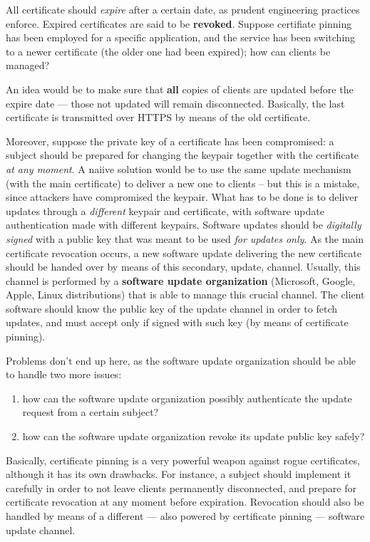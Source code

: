 \documentclass[10pt]{extreport}
\begin{document}
All certificate should \emph{expire} after a certain date, as prudent
engineering practices enforce. Expired certificates are said to be
\textbf{revoked}. Suppose certifiate pinning has been employed for
a specific application, and the service has been switching to a newer
certificate (the older one had been expired); how can clients be managed?

An idea would be to make sure that \textbf{all} copies of clients are updated
before the expire date --- those not updated will remain disconnected.
Basically, the last certificate is transmitted over HTTPS by means of the old
certificate.

Moreover, suppose the private key of a certificate has been compromised: a
subject should be prepared for changing the keypair together with the
certificate \emph{at any moment}. A naiive solution would be to use the same
update mechanism (with the main certificate) to deliver a new one to clients --
but this is a mistake, since attackers have compromised the keypair. What has
to be done is to deliver updates through a \emph{different} keypair and
certificate, with software update authentication made with different keypairs.
Software updates should be \emph{digitally signed} with a public key that was
meant to be used \emph{for updates only}. As the main certificate revocation
occurs, a new software update delivering the new certificate should be handed
over by means of this secondary, update, channel. Usually, this channel is
performed by a \textbf{software update organization} (Microsoft, Google, Apple,
Linux distributions) that is able to manage this crucial channel. The client
software should know the public key of the update channel in order to fetch
updates, and must accept only if signed with such key (by means of certificate
pinning).

Problems don't end up here, as the software update organization should be able
to handle two more issues:
\begin{enumerate}
    \item how can the software update organization possibly authenticate the update request
        from a certain subject?
    \item how can the software update organization revoke its update public key
        safely?
\end{enumerate}

Basically, certificate pinning is a very powerful weapon against rogue
certificates, although it has its own drawbacks. For instance, a subject should
implement it carefully in order to not leave clients permanently disconnected,
and prepare for certificate revocation at any moment before expiration.
Revocation should also be handled by means of a different --- also powered by
certificate pinning --- software update channel.
\end{document}
